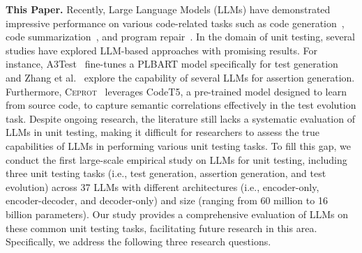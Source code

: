 \textbf{This Paper.}
Recently, Large Language Models (LLMs) have demonstrated impressive performance on various code-related tasks such as code generation~\cite{li_starcoder_2023, wei_magicoder_2024}, code summarization~\cite{sun_prompt_2023, ahmed_automatic_2024}, and program repair~\cite{ zhang2024systematic,zhang2023survey}. 
In the domain of unit testing, several studies have explored LLM-based approaches with promising results. 
For instance, A3Test~\cite{alagarsamy_a3test_2023} fine-tunes a PLBART model specifically for test generation and Zhang et al.~\cite{zhang_exploring_2024} explore the capability of several LLMs for assertion generation. 
Furthermore, \textsc{Ceprot}~\cite{hu_identify_2023} leverages CodeT5, a pre-trained model designed to learn from source code, to capture semantic correlations effectively in the test evolution task. 
Despite ongoing research, the literature still lacks a systematic evaluation of LLMs in unit testing, making it difficult for researchers to assess the true capabilities of LLMs in performing various unit testing tasks.
To fill this gap, we conduct the first large-scale empirical study on LLMs for unit testing, including three unit testing tasks (i.e., test generation, assertion generation, and test evolution) across 37 LLMs with different architectures (i.e., encoder-only, encoder-decoder, and decoder-only) and size (ranging from 60 million to 16 billion parameters). 
Our study provides a comprehensive evaluation of LLMs on these common unit testing tasks, facilitating future research in this area. 
Specifically, we address the following three research questions.

